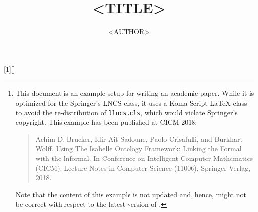 


%
%
\usepackage{textcomp}
\usepackage{xcolor}
\usepackage{paralist}
\usepackage{listings}
\usepackage{lstisadof}
\usepackage{xspace}

%

[1][]{\lstset{style=displaybash, #1}}{}
\def\inlinebash{\lstinline[style=bash, breaklines=true,columns=fullflexible]}

\usepackage[caption]{subfig}
\usepackage[size=footnotesize]{caption}


\subject{Example of an Academic Paper\footnote{%
  This document is an example setup for writing an academic paper. While
  it is optimized for the Springer's LNCS class, it uses a Koma Script
  LaTeX class to avoid the re-distribution of \texttt{llncs.cls},
  which would violate Springer's copyright. This example has been
  published at CICM 2018:
    \protect\begin{quote}
      Achim D. Brucker, Idir Ait-Sadoune, Paolo Crisafulli, and
      Burkhart Wolff. Using The Isabelle Ontology Framework: Linking
      the Formal with the Informal. In Conference on Intelligent
      Computer Mathematics (CICM). Lecture Notes in Computer Science
      (11006), Springer-Verlag, 2018. 
    \protect\end{quote}
    Note that the content of this example is not updated and, hence,
    might not be correct with respect to the latest version of
    \isadof{}. 
    }}


\title{<TITLE>}
\author{<AUTHOR>}

